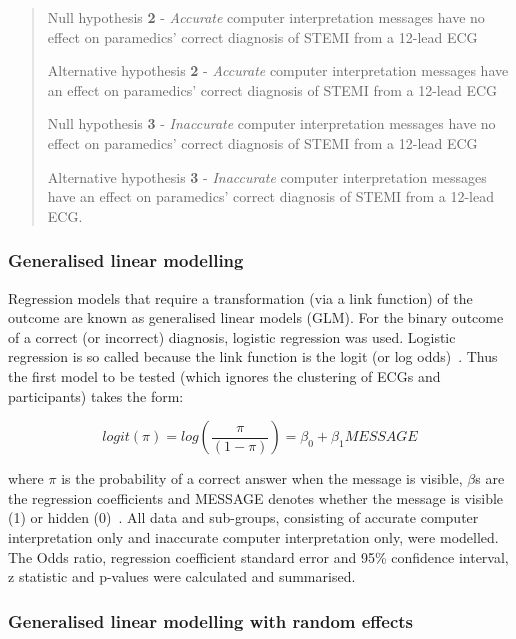 \begin{quote}

Null hypothesis \textbf{2} - \emph{Accurate} computer interpretation messages have no effect on paramedics' correct diagnosis of STEMI from a 12-lead ECG 

Alternative hypothesis \textbf{2} - \emph{Accurate} computer interpretation messages have an effect on paramedics' correct diagnosis of STEMI from a 12-lead ECG

Null hypothesis \textbf{3} - \emph{Inaccurate} computer interpretation messages have no effect on paramedics' correct diagnosis of STEMI from a 12-lead ECG 

Alternative hypothesis \textbf{3} - \emph{Inaccurate} computer interpretation messages have an effect on paramedics' correct diagnosis of STEMI from a 12-lead ECG.
\end{quote}

\subsubsection{Generalised linear modelling}
\label{generalisedlinearmodelling}

Regression models that require a transformation (via a link function) of the outcome are known as generalised linear models (GLM). For the binary outcome of a correct (or incorrect) diagnosis, logistic regression was used. Logistic regression is so called because the link function is the logit (or log odds)~\citep{kirkwood_essential_2003}. Thus the first model to be tested (which ignores the clustering of ECGs and participants) takes the form:

\[  logit(\pi) = log\left(\frac{\pi}{(1-\pi)}\right)=\beta_0+\beta_1MESSAGE \] 

where $ \pi $ is the probability of a correct answer when the message is visible, $ \beta $s are the regression coefficients and MESSAGE denotes whether the message is visible (1) or hidden (0)~\citep{campbell_medical_2007}. All data and sub-groups, consisting of accurate computer interpretation only and inaccurate computer interpretation only, were modelled. The Odds ratio, regression coefficient standard error and 95\% confidence interval, z statistic and p-values were calculated and summarised. 

\subsubsection{Generalised linear modelling with random effects}
\label{generalisedlinearmodellingwithrandomeffects}

